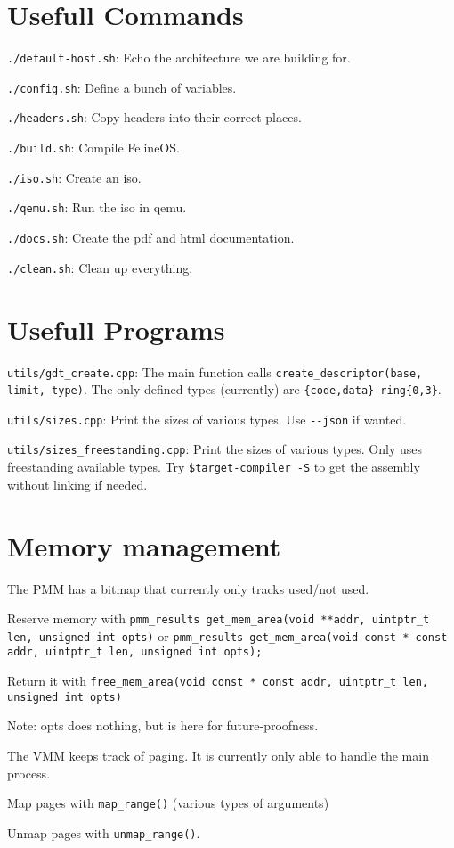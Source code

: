 \documentclass[12pt]{article}
\newcommand{\code}[1]{\colorbox{light-gray}{\texttt{#1}}}
\begin{document}
\section{Usefull Commands}
\begin{list}{}{}
\item \code{./default-host.sh}: Echo the architecture we are building for.
\item \code{./config.sh}: Define a bunch of variables.
\item \code{./headers.sh}: Copy headers into their correct places.
\item \code{./build.sh}: Compile FelineOS.\@
\item \code{./iso.sh}: Create an iso.
\item \code{./qemu.sh}: Run the iso in qemu.
\item \code{./docs.sh}: Create the pdf and html documentation.
\item \code{./clean.sh}: Clean up everything.
\end{list}

\section{Usefull Programs}
\begin{list}{}{}
\item \code{utils/gdt\_create.cpp}: The main function calls \code{create\_descriptor(base, limit, type)}. The only defined types (currently) are \code{\{code,data\}-ring\{0,3\}}.
\item \code{utils/sizes.cpp}: Print the sizes of various types. Use \code{-{}-json} if wanted.
\item \code{utils/sizes\_freestanding.cpp}: Print the sizes of various types. Only uses freestanding available types. Try \code{\$target-compiler -S} to get the assembly without linking if needed.
\end{list}

\section{Memory management}
\begin{list}{}{}
\item The PMM has a bitmap that currently only tracks used/not used.
\item Reserve memory with \code{pmm\_results get\_mem\_area(void **addr, uintptr\_t len, unsigned int opts)} or \code{pmm\_results get\_mem\_area(void const * const addr, uintptr\_t len, unsigned int opts);}
\item Return it with \code{free\_mem\_area(void const * const addr, uintptr\_t len, unsigned int opts)}
\item Note: opts does nothing, but is here for future-proofness.
\item The VMM keeps track of paging. It is currently only able to handle the main process.
\item Map pages with \code{map\_range()} (various types of arguments)
\item Unmap pages with \code{unmap\_range()}.
\end{list}
\end{document}
